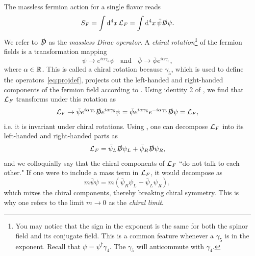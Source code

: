 The massless fermion action for a single flavor reads
\begin{equation}
S_F=\int\dd[4]{x}\mathcal{L}_F=\int\dd[4]{x}\bar{\psi}\slashed{D}\psi. 
\end{equation}
We refer to $\slashed{D}$ as the {\it massless Dirac operator}. A
{\it chiral rotation}\footnote{You may notice that the sign in the exponent
is the same for both the spinor field and its conjugate field. This is a
common feature whenever a $\gamma_5$ is in the exponent. Recall that
$\bar{\psi}=\psi^\dagger\gamma_4$. The $\gamma_5$ will anticommute with
$\gamma_4$.} of the fermion fields is a transformation
mapping
\begin{equation}
  \psi\to e^{i\alpha\gamma_5}\psi~~~~\text{and}~~~~
  \bar{\psi}\to\bar\psi e^{i\alpha\gamma_5},
\end{equation}
where $\alpha\in\mathbb{R}$. This is called a chiral rotation
because $\gamma_5$, which is used to define the operators~\eqref{eq:projdef},
projects out the left-handed and right-handed components of the
fermion field according to . 
Using identity 2 of
, we find that $\mathcal{L}_F$ transforms under this
rotation as
\begin{equation}
  \mathcal{L}_F\to\bar{\psi}e^{i\alpha\gamma_5}\slashed{D}e^{i\alpha\gamma_5}\psi
         =\bar{\psi}e^{i\alpha\gamma_5}e^{-i\alpha\gamma_5}\slashed{D}\psi
         =\mathcal{L}_F,
\end{equation}
i.e. it is invariant under chiral rotations. Using
, one can decompose $\mathcal{L}_F$ into its
left-handed and right-handed parts as
\begin{equation}
  \mathcal{L}_F=\bar{\psi}_L\slashed{D}\psi_L
         +\bar{\psi}_R\slashed{D}\psi_R,
\end{equation}
and we colloquially say that the chiral components of
$\mathcal{L}_F$ ``do not talk to each other."
If one were to include a mass term in $\mathcal{L}_F$, it would decompose as
\begin{equation}
  m\bar{\psi}\psi=m\left(\bar{\psi}_R\psi_L+\bar{\psi}_L\psi_R\right),
\end{equation}
which mixes the chiral components, thereby breaking chiral symmetry.
This is why one refers to the limit $m\to0$ as the {\it chiral limit}.


